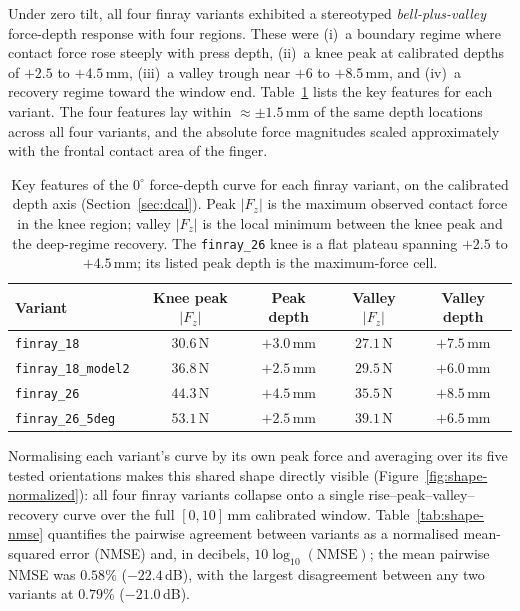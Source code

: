 Under zero tilt, all four finray variants exhibited a stereotyped
\emph{bell-plus-valley} force-depth response with four regions. These
were (i)~a boundary regime where contact force rose steeply with press
depth, (ii)~a knee peak at calibrated depths of $+2.5$ to $+4.5$\,mm,
(iii)~a valley trough near $+6$ to $+8.5$\,mm, and (iv)~a recovery
regime toward the window end. Table~\ref{tab:zero-tilt-summary} lists
the key features for each variant. The four features lay within
$\approx \pm 1.5$\,mm of the same depth locations across all four
variants, and the absolute force magnitudes scaled approximately with
the frontal contact area of the finger.

\begin{table}[ht]
\centering
\caption[Zero-tilt curve summary]{Key features of the $0^{\circ}$
force-depth curve for each finray variant, on the calibrated depth axis
(Section~\ref{sec:dcal}). Peak $|F_z|$ is the maximum
observed contact force in the knee region; valley $|F_z|$ is the local
minimum between the knee peak and the deep-regime recovery. The
\texttt{finray\_26} knee is a flat plateau spanning $+2.5$ to
$+4.5$\,mm; its listed peak depth is the maximum-force cell.}
\label{tab:zero-tilt-summary}
\begin{tabular}{lcccc}
\toprule
Variant & Knee peak $|F_z|$ & Peak depth & Valley $|F_z|$ & Valley depth \\
\midrule
\texttt{finray\_18}        & $30.6$\,N & $+3.0$\,mm & $27.1$\,N & $+7.5$\,mm \\
\texttt{finray\_18\_model2} & $36.8$\,N & $+2.5$\,mm & $29.5$\,N & $+6.0$\,mm \\
\texttt{finray\_26}        & $44.3$\,N & $+4.5$\,mm & $35.5$\,N & $+8.5$\,mm \\
\texttt{finray\_26\_5deg}  & $53.1$\,N & $+2.5$\,mm & $39.1$\,N & $+6.5$\,mm \\
\bottomrule
\end{tabular}
\end{table}

Normalising each variant's curve by its own peak force and averaging
over its five tested orientations makes this shared shape directly
visible (Figure~\ref{fig:shape-normalized}): all four finray variants
collapse onto a single rise--peak--valley--recovery curve over the full
$[0,10]$\,mm calibrated window. Table~\ref{tab:shape-nmse} quantifies
the pairwise agreement between variants as a normalised mean-squared
error (NMSE) and, in decibels, $10\log_{10}(\text{NMSE})$; the mean
pairwise NMSE was $0.58\%$ ($-22.4$\,dB), with the largest
disagreement between any two variants at $0.79\%$ ($-21.0$\,dB).


